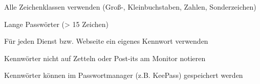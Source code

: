 \item Alle Zeichenklassen verwenden (Groß-, Kleinbuchstaben, Zahlen, Sonderzeichen)
\item Lange Passwörter (> 15 Zeichen)
\item Für jeden Dienst bzw. Webseite ein eigenes Kennwort verwenden
\item Kennwörter nicht auf Zetteln oder Post-its am Monitor notieren
\item Kennwörter können im Passwortmanager (z.B. KeePass) gespeichert werden